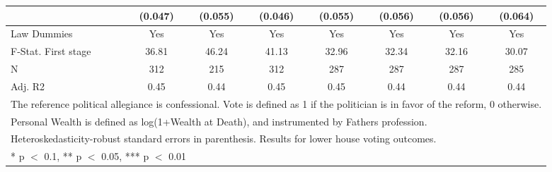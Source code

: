 \begin{table}
\begin{tabular}[t]{lccccccc}
 & (\num{0.047}) & (\num{0.055}) & (\num{0.046}) & (\num{0.055}) & (\num{0.056}) & (\num{0.056}) & (\num{0.064})\\
\midrule
Law Dummies & Yes & Yes & Yes & Yes & Yes & Yes & Yes\\
F-Stat. First stage & 36.81 & 46.24 & 41.13 & 32.96 & 32.34 & 32.16 & 30.07\\
N & \num{312} & \num{215} & \num{312} & \num{287} & \num{287} & \num{287} & \num{285}\\
Adj. R2 & \num{0.45} & \num{0.44} & \num{0.45} & \num{0.45} & \num{0.44} & \num{0.44} & \num{0.44}\\
\bottomrule
\multicolumn{8}{l}{\rule{0pt}{1em}The reference political allegiance is confessional. Vote is defined as 1 if the politician is in favor of the reform, 0 otherwise.}\\
\multicolumn{8}{l}{\rule{0pt}{1em}Personal Wealth is defined as log(1+Wealth at Death), and instrumented by Fathers profession.}\\
\multicolumn{8}{l}{\rule{0pt}{1em}Heteroskedasticity-robust standard errors in parenthesis. Results for lower house voting outcomes.}\\
\multicolumn{8}{l}{\rule{0pt}{1em}* p $<$ 0.1, ** p $<$ 0.05, *** p $<$ 0.01}\\
\end{tabular}
\end{table}
